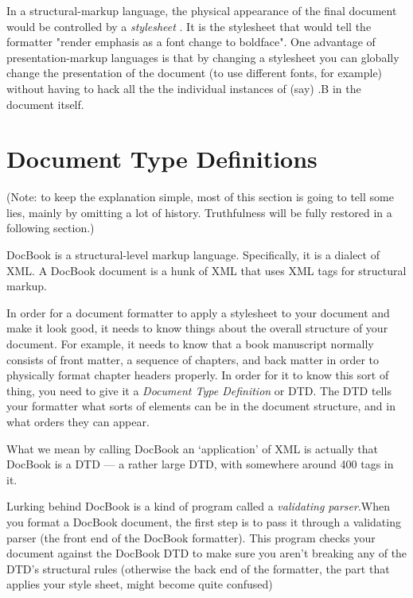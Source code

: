 \documentclass[pdftex,english,a4paper,10pt]{infocom}
\begin{document}
In a structural-markup language, the physical appearance of the
final document would be controlled by a {\em stylesheet}
.  It is the
stylesheet that would tell the formatter "render emphasis as a font
change to boldface".  One advantage of presentation-markup languages
is that by changing a stylesheet you can globally change the
presentation of the document (to use different fonts, for example)
without having to hack all the the individual instances of (say)
.B in the document itself.

\section{Document Type Definitions}
\label{id2716782}\hypertarget{id2716782}{}%

(Note: to keep the explanation simple, most of this
section is going to tell some lies, mainly by omitting a lot of 
history.  Truthfulness will be fully restored in a following
section.)

DocBook is a structural-level markup language.  Specifically, it
is a dialect of XML.  A DocBook document is a hunk of XML that uses
XML tags for structural markup.

In order for a document formatter to apply a stylesheet to your
document and make it look good, it needs to know things about the
overall structure of your document.  For example, it needs to know
that a book manuscript normally consists of front matter, a sequence
of chapters, and back matter in order to physically format chapter
headers properly.  In order for it to know this sort of thing, you
need to give it a {\em Document Type
Definition} or DTD. The
DTD tells your formatter what sorts of elements can be in the document
structure, and in what orders they can appear.

What we mean by calling DocBook an `application' of XML is
actually that DocBook is a DTD --- a rather large DTD, with
somewhere around 400 tags in it.

Lurking behind DocBook is a kind of program called a
{\em validating parser}.When you format a DocBook document, the
first step is to pass it through a validating parser (the front end of
the DocBook formatter).  This program checks your document against the
DocBook DTD to make sure you aren't breaking any of the DTD's
structural rules (otherwise the back end of the formatter, the part
that applies your style sheet, might become quite confused)
\end{document}
